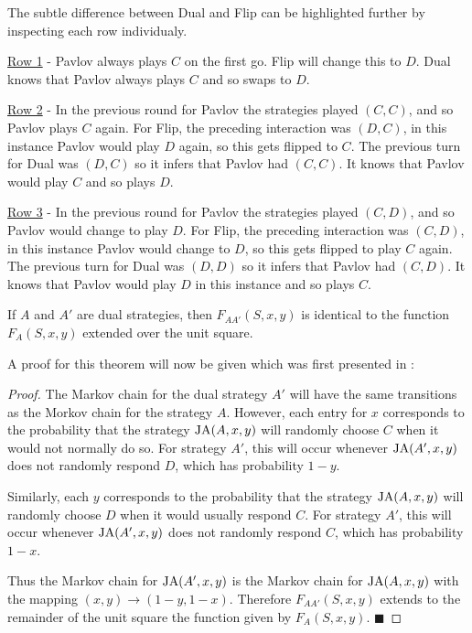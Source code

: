 The subtle difference between Dual and Flip can be highlighted further by inspecting each row individualy.

\underline{Row 1} - Pavlov always plays $C$ on the first go.
Flip will change this to $D$.
Dual knows that Pavlov always plays $C$ and so swaps to $D$.

\underline{Row 2} - In the previous round for Pavlov the strategies played $(C, C)$, and so Pavlov plays $C$ again.
For Flip, the preceding interaction was $(D, C)$, in this instance Pavlov would play $D$ again, so this gets flipped to $C$.
The previous turn for Dual was $(D, C)$ so it infers that Pavlov had $(C, C)$.
It knows that Pavlov would play $C$ and so plays $D$.

\underline{Row 3} - In the previous round for Pavlov the strategies played $(C, D)$, and so Pavlov would change to play $D$.
For Flip, the preceding interaction was $(C, D)$, in this instance Pavlov would change to $D$, so this gets flipped to play $C$ again.
The previous turn for Dual was $(D, D)$ so it infers that Pavlov had $(C, D)$.
It knows that Pavlov would play $D$ in this instance and so plays $C$.



\begin{theorem}\label{thm:fingerprint-unit-square}
If $A$ and $A'$ are dual strategies, then $F_{AA'}(S, x, y)$ is identical to the function $F_A(S, x, y)$ extended over the unit square.
\end{theorem}

A proof for this theorem will now be given which was first presented in \cite{Ashlock2004}:
\begin{proof}\label{prf:fingerprint-unit-square}
The Markov chain for the dual strategy $A'$ will have the same transitions as the Morkov chain for the strategy $A$.
However, each entry for $x$ corresponds to the probability that the strategy $\text{JA}(A, x, y)$ will randomly choose $C$ when it would not normally do so.
For strategy $A'$, this will occur whenever $\text{JA}(A', x, y)$ does not randomly respond $D$, which has probability $1 - y$.

Similarly, each $y$ corresponds to the probability that the strategy $\text{JA}(A, x, y)$ will randomly choose $D$ when it would usually respond $C$.
For strategy $A'$, this will occur whenever $\text{JA}(A', x, y)$ does not randomly respond $C$, which has probability $1 - x$.

Thus the Markov chain for $\text{JA}(A', x, y)$ is the Markov chain for $\text{JA}(A, x, y)$ with the mapping $(x, y) \rightarrow (1-y, 1-x)$.
Therefore $F_{AA'}(S, x, y)$ extends to the remainder of the unit square the function given by $F_A(S, x, y)$. $\blacksquare$
\end{proof}

